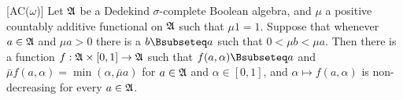  [AC($\omega$)]
Let $\frak A$ be a Dedekind $\sigma$-complete Boolean algebra, and
$\mu$ a positive countably additive functional on $\frak A$ such that
$\mu 1=1$.   Suppose that whenever $a\in\frak A$ and $\mu a>0$ there is a
$b\Bsubseteq a$ such that $0<\mu b<\mu a$.
Then there is a function $f:\frak A\times[0,1]\to\frak A$ such that
$f(a,\alpha)\Bsubseteq a$ and $\bar\mu f(a,\alpha)=\min(\alpha,\bar\mu a)$
for $a\in\frak A$ and $\alpha\in[0,1]$, and
$\alpha\mapsto f(a,\alpha)$ is non-decreasing for every $a\in\frak A$.

